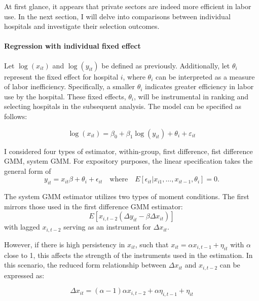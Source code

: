 \documentclass[12pt]{article}
\begin{document}
At first glance, it appears that private sectors are indeed more efficient in
labor use. In the next section, I will delve into comparisons between
individual hospitals and investigate their selection outcomes.

\paragraph{Regression with individual fixed effect}

Let $\log(x_{it})$ and $\log(y_{it})$ be defined as previously. Additionally,
let $\theta_i$ represent the fixed effect for hospital $i$, where $\theta_i$
can be interpreted as a measure of labor inefficiency. Specifically, a smaller
$\theta_i$ indicates greater efficiency in labor use by the hospital. These
fixed effects, $\theta_i$, will be instrumental in ranking and selecting
hospitals in the subsequent analysis. The model can be specified as follows:

\begin{equation}
    \log(x_{it}) = \beta_0 + \beta_1 \log(y_{it}) + \theta_i + \varepsilon_{it}
\end{equation}

I considered four types of estimator, within-group, first difference, fist
difference GMM, system GMM. For expository purposes, the linear specification
takes the general form of
\begin{equation*}
    y_{it} = x_{it} \beta +\theta_i + \epsilon_{it}\quad \text{where} \quad E[\epsilon_{it}|x_{i1},\ldots, x_{it-1},\theta_i]=0.
\end{equation*}

The system GMM estimator utilizes two types of moment conditions. The first
mirrors those used in the first difference GMM estimator:
\[E[x_{i,t-2}(\Delta y_{it}-\beta\Delta x_{it})]\]
with lagged $x_{i,t-2}$ serving as an instrument for $\Delta x_{it}$.

However, if there is high persistency in \( x_{it} \), such that \( x_{it} =
\alpha x_{i,t-1} + \eta_{it} \) with \( \alpha \) close to 1, this affects the
strength of the instruments used in the estimation. In this scenario, the
reduced form relationship between \( \Delta x_{it} \) and \( x_{i,t-2} \) can
be expressed as:

\begin{equation*}
    \Delta x_{it} = (\alpha-1)\alpha x_{i,t-2} + \alpha \eta_{i,t-1} + \eta_{it}
\end{equation*}
\end{document}
